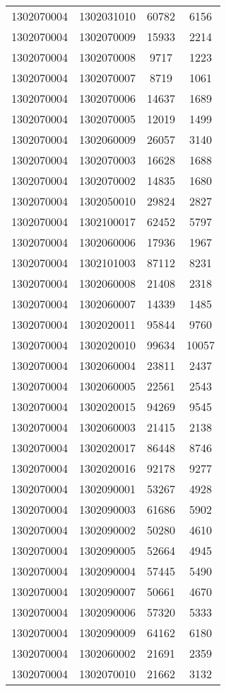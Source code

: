 \begin{longtable}{llcc}
1302070004 & 1302031010 & 60782 & 6156\\
1302070004 & 1302070009 & 15933 & 2214\\
1302070004 & 1302070008 & 9717 & 1223\\
1302070004 & 1302070007 & 8719 & 1061\\
1302070004 & 1302070006 & 14637 & 1689\\
1302070004 & 1302070005 & 12019 & 1499\\
1302070004 & 1302060009 & 26057 & 3140\\
1302070004 & 1302070003 & 16628 & 1688\\
1302070004 & 1302070002 & 14835 & 1680\\
1302070004 & 1302050010 & 29824 & 2827\\
1302070004 & 1302100017 & 62452 & 5797\\
1302070004 & 1302060006 & 17936 & 1967\\
1302070004 & 1302101003 & 87112 & 8231\\
1302070004 & 1302060008 & 21408 & 2318\\
1302070004 & 1302060007 & 14339 & 1485\\
1302070004 & 1302020011 & 95844 & 9760\\
1302070004 & 1302020010 & 99634 & 10057\\
1302070004 & 1302060004 & 23811 & 2437\\
1302070004 & 1302060005 & 22561 & 2543\\
1302070004 & 1302020015 & 94269 & 9545\\
1302070004 & 1302060003 & 21415 & 2138\\
1302070004 & 1302020017 & 86448 & 8746\\
1302070004 & 1302020016 & 92178 & 9277\\
1302070004 & 1302090001 & 53267 & 4928\\
1302070004 & 1302090003 & 61686 & 5902\\
1302070004 & 1302090002 & 50280 & 4610\\
1302070004 & 1302090005 & 52664 & 4945\\
1302070004 & 1302090004 & 57445 & 5490\\
1302070004 & 1302090007 & 50661 & 4670\\
1302070004 & 1302090006 & 57320 & 5333\\
1302070004 & 1302090009 & 64162 & 6180\\
1302070004 & 1302060002 & 21691 & 2359\\
1302070004 & 1302070010 & 21662 & 3132\\

\end{longtable}
